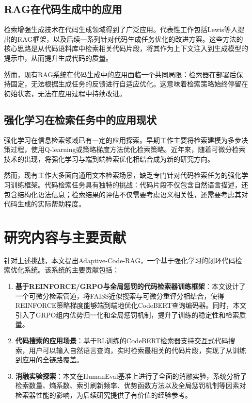 \documentclass[
    fontset = win, %
  ]{njuthesis}
\begin{document}
\subsection{RAG在代码生成中的应用}

检索增强生成技术在代码生成领域得到了广泛应用。代表性工作包括Lewis等人提出的RAG框架\cite{rag2020}，以及后续一系列针对代码生成任务优化的改进方案。这些方法的核心思路是从代码语料库中检索相关代码片段，将其作为上下文注入到生成模型的提示中，从而提升生成代码的质量。

然而，现有RAG系统在代码生成中的应用面临一个共同局限：检索器在部署后保持固定，无法根据生成任务的反馈进行自适应优化。这意味着检索策略始终停留在初始状态，无法在应用过程中持续改进。

\subsection{强化学习在检索任务中的应用现状}

强化学习在信息检索领域已有一定的应用探索。早期工作主要将检索建模为多步决策过程，使用Q-learning或策略梯度方法优化检索策略。近年来，随着可微分检索技术的出现，将强化学习与端到端检索优化相结合成为新的研究方向。

然而，现有工作大多面向通用文本检索场景，缺乏专门针对代码检索任务的强化学习训练框架。代码检索任务具有独特的挑战：代码片段不仅包含自然语言描述，还包含结构化语法信息；检索结果的评估不仅需要考虑语义相关性，还需要考虑其对代码生成的实际帮助程度。

\section{研究内容与主要贡献}

针对上述挑战，本文提出Adaptive-Code-RAG，一个基于强化学习的闭环代码检索优化系统。该系统的主要贡献包括：

\begin{enumerate}
    \item \textbf{基于REINFORCE/GRPO与全局惩罚的代码检索器训练框架}：本文设计了一个可微分检索管道，将FAISS\cite{faiss2019}近似搜索与可微分重评分相结合，使得REINFORCE策略梯度能够端到端地优化CodeBERT查询编码器。同时，本文引入了GRPO组内优势归一化和全局惩罚机制，提升了训练的稳定性和检索质量。
    \item \textbf{代码搜索的应用场景}：基于RL训练的CodeBERT检索器支持交互式代码搜索，用户可以输入自然语言查询，实时检索最相关的代码片段，实现了从训练到应用的全链路覆盖。
    \item \textbf{消融实验探索}：本文在HumanEval基准上进行了全面的消融实验，系统分析了检索数量、熵系数、索引刷新频率、优势函数方法以及全局惩罚机制等因素对检索器性能的影响，为后续研究提供了有价值的经验参考。
\end{enumerate}
\end{document}
